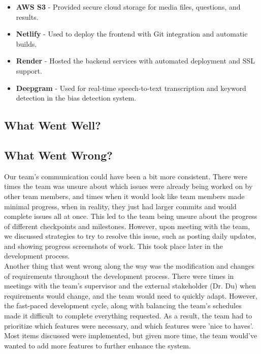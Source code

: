\documentclass{article}
\begin{document}
\begin{itemize}
    \item \textbf{AWS S3} - Provided secure cloud storage for media files, questions, and results.
    
    \item \textbf{Netlify} - Used to deploy the frontend with Git integration and automatic builds.
    
    \item \textbf{Render} - Hosted the backend services with automated deployment and SSL support.
    
    \item \textbf{Deepgram} - Used for real-time speech-to-text transcription and keyword detection in the 
    bias detection system.
\end{itemize}

\subsection{What Went Well?}




\subsection{What Went Wrong?}

\hspace{2em}Our team's communication could have been a bit more consistent. There were times the team was unsure about which issues were already being worked on by other team members,
and times when it would look like team members made minimal progress, when in reality, they just had larger commits and would complete issues all at once. This led to
the team being unsure about the progress of different checkpoints and milestones. However, upon meeting with the team, we discussed strategies to try to resolve this issue, such
as posting daily updates, and showing progress screenshots of work. This took place later in the development process.\\

Another thing that went wrong along the way was the modification and changes of requirements throughout the development process. There were times in meetings with the team's supervisor and
the external stakeholder (Dr. Du) when requirements would change, and the team would need to quickly adapt. However, the fast-paced development cycle, along with balancing the team's schedules
made it difficult to complete everything requested. As a result, the team had to prioritize which features were necessary, and which features were 'nice to haves'. Most items discussed were implemented,
but given more time, the team would've wanted to add more features to further enhance the system.
\end{document}
